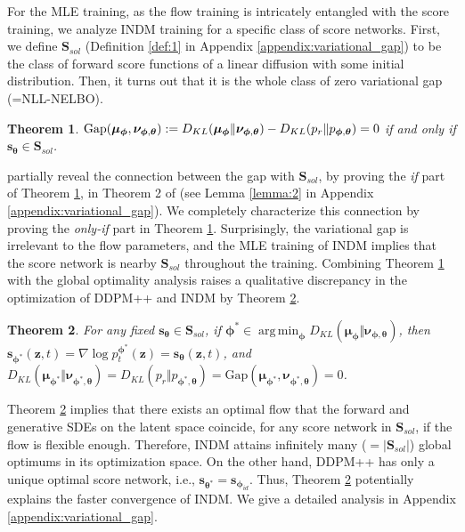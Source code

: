 \documentclass{article}
\newtheorem{theorem}{Theorem}\newtheorem{proposition}{Proposition}
\theoremstyle{definition}
\theoremstyle{remark}
\DeclareMathOperator*{\argmin}{arg\,min}
\begin{document}
	For the MLE training, as the flow training is intricately entangled with the score training, we analyze INDM training for a specific class of score networks. First, we define $\mathbf{S}_{sol}$ (Definition \ref{def:1} in Appendix \ref{appendix:variational_gap}) to be the class of forward score functions of a linear diffusion with some initial distribution. Then, it turns out that it is the whole class of zero variational gap (=NLL-NELBO).
	\begin{theorem}\label{cor:2}
		$\textup{Gap}(\bm{\mu}_{\bm{\phi}},\bm{\nu}_{\bm{\phi},\bm{\theta}}):=D_{KL}(\bm{\mu}_{\bm{\phi}}\Vert\bm{\nu}_{\bm{\phi},\bm{\theta}})-D_{KL}(p_{r}\Vert p_{\bm{\phi},\bm{\theta}})=0$ if and only if $\mathbf{s}_{\bm{\theta}}\in\mathbf{S}_{sol}$. 
	\end{theorem}
	\citet{song2021maximum} partially reveal the connection between the gap with $\mathbf{S}_{sol}$, by proving the \textit{if} part of Theorem \ref{cor:2}, in Theorem 2 of \citet{song2021maximum} (see Lemma \ref{lemma:2} in Appendix \ref{appendix:variational_gap}). We completely characterize this connection by proving the \textit{only-if} part in Theorem \ref{cor:2}. Surprisingly, the variational gap is irrelevant to the flow parameters, and the MLE training of INDM implies that the score network is nearby $\mathbf{S}_{sol}$ throughout the training. Combining Theorem \ref{cor:2} with the global optimality analysis raises a qualitative discrepancy in the optimization of DDPM++ and INDM by Theorem \ref{thm:3}.
	\begin{theorem}\label{thm:3}
		For any fixed $\mathbf{s}_{\bm{\theta}}\in\mathbf{S}_{sol}$, if $\bm{\phi}^{*}\in\argmin_{\bm{\phi}}{D_{KL}(\bm{\mu}_{\bm{\phi}}\Vert \bm{\nu}_{\bm{\phi},\bm{\theta}})}$, then $\mathbf{s}_{\bm{\phi}^{*}}(\mathbf{z},t)=\nabla\log{p_{t}^{\bm{\phi}^{*}}(\mathbf{z})}=\mathbf{s}_{\bm{\theta}}(\mathbf{z},t)$, and $D_{KL}(\bm{\mu}_{\bm{\phi}^{*}}\Vert \bm{\nu}_{\bm{\phi}^{*},\bm{\theta}})=D_{KL}(p_{r}\Vert p_{\bm{\phi}^{*},\bm{\theta}})=\text{Gap}(\bm{\mu}_{\bm{\phi}^{*}},\bm{\nu}_{\bm{\phi}^{*},\bm{\theta}})=0$.
	\end{theorem}
	Theorem \ref{thm:3} implies that there exists an optimal flow that the forward and generative SDEs on the latent space coincide, for any score network in $\mathbf{S}_{sol}$, if the flow is flexible enough. Therefore, INDM attains infinitely many ($=\vert\mathbf{S}_{sol}\vert$) global optimums in its optimization space. On the other hand, DDPM++ has only a unique optimal score network, i.e., $\mathbf{s}_{\bm{\theta}^{*}}=\mathbf{s}_{\bm{\phi}_{id}}$. Thus, Theorem \ref{thm:3} potentially explains the faster convergence of INDM. We give a detailed analysis in Appendix \ref{appendix:variational_gap}.
	
\end{document}
